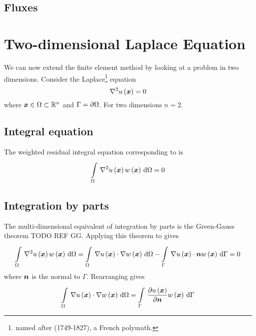 \subsection{Fluxes}
\label{subsec:Fluxes}

\section{Two-dimensional Laplace Equation}
\label{sec:FEMTwoDLaplaceEquation}

We can now extend the finite element method by looking at a problem in two dimensions. Consider the Laplace\footnote{named after  (1749-1827), a French polymath.} equation
\begin{equation}
  \laplacian{}{\fnof{u}{\vectr{x}}}=0
  \label{eqn:FEMLaplaceEquation}
\end{equation}
where $\vectr{x}\in\Omega\subset\rntopology{n}$ and $\Gamma= \partial{\Omega} $. For two dimensions $n=2$.

\subsection{Integral equation}
\label{subsec:FEMTwoDLaplaceIntegralEquation}

The weighted residual integral equation corresponding to  is
\begin{equation}
  \gint{\Omega}{}{\laplacian{}{\fnof{u}{\vectr{x}}}\fnof{w}{\vectr{x}}}{\Omega}=0
  \label{eqn:FEMLaplaceWeightedResidual}
\end{equation}

\subsection{Integration by parts}
\label{subsec:FEMTwoDLaplaceIntegrationByParts}

The multi-dimensional equivalent of integration by parts is the Green-Gauss theorem TODO REF GG. Applying this theorem to  gives
\begin{equation}
  \gint{\Omega}{}{\laplacian{}{\fnof{u}{\vectr{x}}}\fnof{w}{\vectr{x}}}{\Omega}=
    \gint{\Omega}{}{\dotprod{\gradient{}{\fnof{u}{\vectr{x}}}}{\gradient{}{\fnof{w}{\vectr{x}}}}}{\Omega}-
    \gint{\Gamma}{}{\dotprod{\gradient{}{\fnof{u}{\vectr{x}}}}{\vectr{n}}\fnof{w}{\vectr{x}}}{\Gamma}=0
\end{equation}
where $ \boldsymbol{n} $ is the normal to $\Gamma$. Rearranging gives
\begin{equation}
  \gint{\Omega}{}{\dotprod{\gradient{}{\fnof{u}{\vectr{x}}}}{\gradient{}{\fnof{w}{\vectr{x}}}}}{\Omega}=
  \gint{\Gamma}{}{\delby{\fnof{u}{\vectr{x}}}{\vectr{n}}\fnof{w}{\vectr{x}}}{\Gamma}
  \label{eqn:FEMLaplaceStartingIntegralEquation}
\end{equation}

